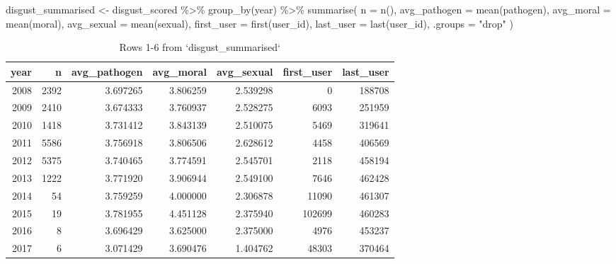 \documentclass[
  oneside]{book}
\newenvironment{Shaded}{\begin{snugshade}}{\end{snugshade}}
\newcommand{\AttributeTok}[1]{\textcolor[rgb]{0.77,0.63,0.00}{#1}}
\newcommand{\FunctionTok}[1]{\textcolor[rgb]{0.00,0.00,0.00}{#1}}
\newcommand{\NormalTok}[1]{#1}
\newcommand{\OtherTok}[1]{\textcolor[rgb]{0.56,0.35,0.01}{#1}}
\newcommand{\SpecialCharTok}[1]{\textcolor[rgb]{0.00,0.00,0.00}{#1}}
\newcommand{\StringTok}[1]{\textcolor[rgb]{0.31,0.60,0.02}{#1}}
\begin{document}
\begin{Shaded}
\begin{Highlighting}[]
\NormalTok{disgust\_summarised }\OtherTok{\textless{}{-}}\NormalTok{ disgust\_scored }\SpecialCharTok{\%\textgreater{}\%}
  \FunctionTok{group\_by}\NormalTok{(year) }\SpecialCharTok{\%\textgreater{}\%}
  \FunctionTok{summarise}\NormalTok{(}
    \AttributeTok{n =} \FunctionTok{n}\NormalTok{(),}
    \AttributeTok{avg\_pathogen =} \FunctionTok{mean}\NormalTok{(pathogen),}
    \AttributeTok{avg\_moral =} \FunctionTok{mean}\NormalTok{(moral),}
    \AttributeTok{avg\_sexual =} \FunctionTok{mean}\NormalTok{(sexual),}
    \AttributeTok{first\_user =} \FunctionTok{first}\NormalTok{(user\_id),}
    \AttributeTok{last\_user =} \FunctionTok{last}\NormalTok{(user\_id),}
    \AttributeTok{.groups =} \StringTok{"drop"}
\NormalTok{  )}
\end{Highlighting}
\end{Shaded}

\begin{table}

\caption{\label{tab:all-summarised}Rows 1-6 from `disgust_summarised`}
\centering
\begin{tabular}[t]{r|r|r|r|r|r|r}
\hline
year & n & avg\_pathogen & avg\_moral & avg\_sexual & first\_user & last\_user\\
\hline
2008 & 2392 & 3.697265 & 3.806259 & 2.539298 & 0 & 188708\\
\hline
2009 & 2410 & 3.674333 & 3.760937 & 2.528275 & 6093 & 251959\\
\hline
2010 & 1418 & 3.731412 & 3.843139 & 2.510075 & 5469 & 319641\\
\hline
2011 & 5586 & 3.756918 & 3.806506 & 2.628612 & 4458 & 406569\\
\hline
2012 & 5375 & 3.740465 & 3.774591 & 2.545701 & 2118 & 458194\\
\hline
2013 & 1222 & 3.771920 & 3.906944 & 2.549100 & 7646 & 462428\\
\hline
2014 & 54 & 3.759259 & 4.000000 & 2.306878 & 11090 & 461307\\
\hline
2015 & 19 & 3.781955 & 4.451128 & 2.375940 & 102699 & 460283\\
\hline
2016 & 8 & 3.696429 & 3.625000 & 2.375000 & 4976 & 453237\\
\hline
2017 & 6 & 3.071429 & 3.690476 & 1.404762 & 48303 & 370464\\
\hline
\end{tabular}
\end{table}
\end{document}
